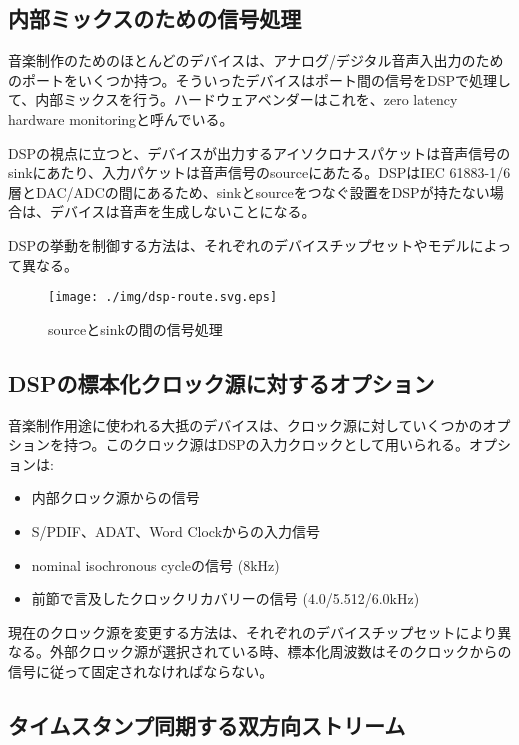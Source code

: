 \documentclass[onecolumn]{jarticle}
\begin{document}
\subsection{内部ミックスのための信号処理}
\label{sec:internal-mixing}

音楽制作のためのほとんどのデバイスは、アナログ/デジタル音声入出力のためのポートをいくつか持つ。そういったデバイスはポート間の信号をDSPで処理して、内部ミックスを行う。ハードウェアベンダーはこれを、zero latency hardware monitoringと呼んでいる。

DSPの視点に立つと、デバイスが出力するアイソクロナスパケットは音声信号のsinkにあたり、入力パケットは音声信号のsourceにあたる。DSPはIEC 61883-1/6層とDAC/ADCの間にあるため、sinkとsourceをつなぐ設置をDSPが持たない場合は、デバイスは音声を生成しないことになる。

DSPの挙動を制御する方法は、それぞれのデバイスチップセットやモデルによって異なる。

\begin{figure}[H]
	\centering
	\texttt{[image: ./img/dsp-route.svg.eps]}
	\caption{{sourceとsinkの間の信号処理}}
	\label{dsp-route}
\end{figure}

\subsection{DSPの標本化クロック源に対するオプション}

音楽制作用途に使われる大抵のデバイスは、クロック源に対していくつかのオプションを持つ。このクロック源はDSPの入力クロックとして用いられる。オプションは:
\begin{itemize}
	\item 内部クロック源からの信号
	\item S/PDIF、ADAT、Word Clockからの入力信号
	\item nominal isochronous cycleの信号 (8kHz)
	\item 前節で言及したクロックリカバリーの信号 (4.0/5.512/6.0kHz)
\end{itemize}

現在のクロック源を変更する方法は、それぞれのデバイスチップセットにより異なる。外部クロック源が選択されている時、標本化周波数はそのクロックからの信号に従って固定されなければならない。


\subsection{タイムスタンプ同期する双方向ストリーム}
\label{sec:duplex-streams}
\end{document}
